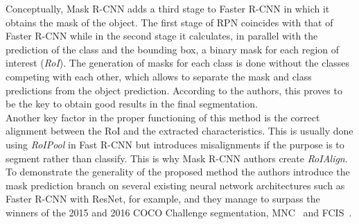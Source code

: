 Conceptually, Mask R-CNN adds a third stage to Faster R-CNN in which it obtains the mask of the object. The first stage of RPN coincides with that of Faster R-CNN while in the second stage it calculates, in parallel with the prediction of the class and the bounding box, a binary mask for each region of interest (\textit{RoI}). The generation of masks for each class is done without the classes competing with each other, which allows to separate the mask and class predictions from the object prediction. According to the authors, this proves to be the key to obtain good results in the final segmentation.\\ 
Another key factor in the proper functioning of this method is the correct alignment between the RoI and the extracted characteristics. This is usually done using \textit{RoIPool} in Fast R-CNN but introduces misalignments if the purpose is to segment rather than classify. This is why Mask R-CNN authors create \textit{RoIAlign}. To demonstrate the generality of the proposed method the authors introduce the mask prediction branch on several existing neural network architectures such as Faster R-CNN with ResNet, for example, and they manage to surpass the winners of the 2015 and 2016 COCO Challenge segmentation, MNC~\cite{dai2016instance} and FCIS~\cite{li2016fully}.\\

